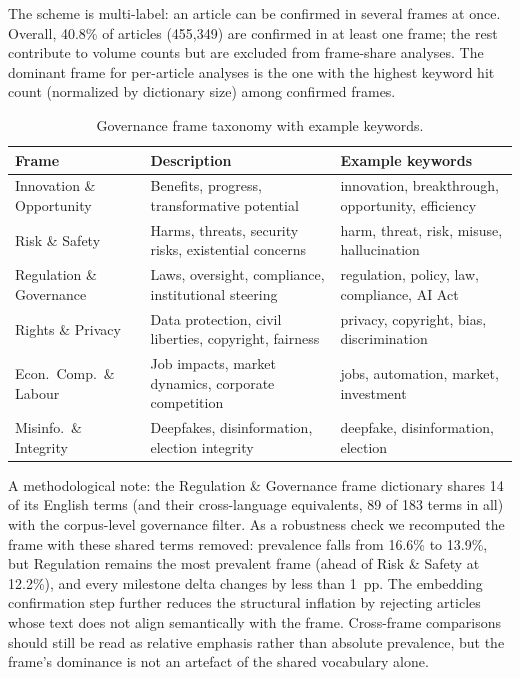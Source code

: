 \documentclass[sigconf]{acmart}
\begin{document}
The scheme is multi-label: an article can be confirmed in several frames at once.
Overall, 40.8\% of articles (455,349) are confirmed in at least one frame; the rest contribute to volume counts but are excluded from frame-share analyses.
The dominant frame for per-article analyses is the one with the highest keyword hit count (normalized by dictionary size) among confirmed frames.

\begin{table}[!t]
\caption{Governance frame taxonomy with example keywords.}
\label{tab:frames}
\footnotesize
\setlength{\tabcolsep}{4pt}
\begin{tabular}{p{1.9cm}p{2.5cm}p{2.4cm}}
\toprule
\textbf{Frame} & \textbf{Description} & \textbf{Example keywords} \\
\midrule
Innovation \& Opportunity & Benefits, progress, transformative potential & innovation, breakthrough, opportunity, efficiency \\[2pt]
Risk \& Safety & Harms, threats, security risks, existential concerns & harm, threat, risk, misuse, hallucination \\[2pt]
Regulation \& Governance & Laws, oversight, compliance, institutional steering & regulation, policy, law, compliance, AI Act \\[2pt]
Rights \& Privacy & Data protection, civil liberties, copyright, fairness & privacy, copyright, bias, discrimination \\[2pt]
Econ.\ Comp.\ \& Labour & Job impacts, market dynamics, corporate competition & jobs, automation, market, investment \\[2pt]
Misinfo.\ \& Integrity & Deepfakes, disinformation, election integrity & deepfake, disinformation, election \\
\bottomrule
\end{tabular}
\end{table}

A methodological note: the Regulation \& Governance frame dictionary shares 14 of its English terms (and their cross-language equivalents, 89 of 183 terms in all) with the corpus-level governance filter.
As a robustness check we recomputed the frame with these shared terms removed: prevalence falls from 16.6\% to 13.9\%, but Regulation remains the most prevalent frame (ahead of Risk \& Safety at 12.2\%), and every milestone delta changes by less than 1~pp.
The embedding confirmation step further reduces the structural inflation by rejecting articles whose text does not align semantically with the frame.
Cross-frame comparisons should still be read as relative emphasis rather than absolute prevalence, but the frame's dominance is not an artefact of the shared vocabulary alone.
\end{document}
